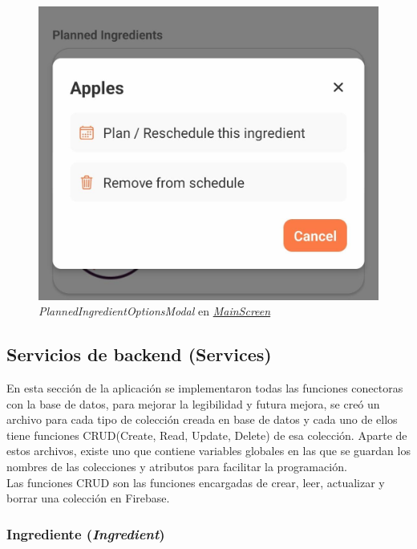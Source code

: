 \documentclass[twoside, openright, 11pt]{report}
\begin{document}
					\begin{figure}[H]
						\centering
						\includegraphics[scale=0.2]{imagenes/IngredientOptionsModal.jpeg}
						\caption{\textit{PlannedIngredientOptionsModal} en \hyperref[fig:MainScreen]{\textit{MainScreen}}}
						\label{fig:PlannedIngredientOptionsModal}
					\end{figure}
		\subsection{Servicios de backend (Services)}
			
				En esta sección de la aplicación se implementaron todas las funciones conectoras con la base de datos, para mejorar la legibilidad y futura mejora, se creó un archivo para cada tipo de colección creada en base de datos y cada uno de ellos tiene funciones CRUD(Create, Read, Update, Delete) de esa colección. Aparte de estos archivos, existe uno que contiene variables globales en las que se guardan los nombres de las colecciones y atributos para facilitar la programación.\\
				Las funciones CRUD son las funciones encargadas de crear, leer, actualizar y borrar una colección en Firebase. 
				
				\subsubsection{Ingrediente (\textit{Ingredient})}
				
\end{document}
